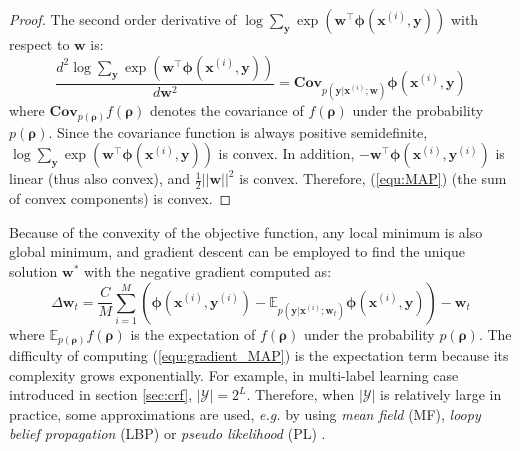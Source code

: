 \begin{proof}
    The second order derivative of $\log \sum_{\mathbf{y}} \exp(\mathbf{w}^\top \boldsymbol{\phi}(\mathbf{x}^{(i)},\mathbf{y}))$ with respect to 
    $\mathbf{w}$ is:
    \begin{equation}
    \frac{d^2 \log \sum_{\mathbf{y}} \exp(\mathbf{w}^\top \boldsymbol{\phi}(\mathbf{x}^{(i)},\mathbf{y}))}{d \mathbf{w}^2}=\mathbf{Cov}_{p(\mathbf{y}|\mathbf{x}^{(i)};\mathbf{w})}\boldsymbol{\phi}(\mathbf{x}^{(i)},\mathbf{y})
    \end{equation}
    where $\mathbf{Cov}_{p(\boldsymbol{\rho})}f(\boldsymbol{\rho})$ denotes the covariance of $f(\boldsymbol{\rho})$ under the probability $p(\boldsymbol{\rho})$. 
    Since the covariance function is always positive semidefinite, $\log \sum_{\mathbf{y}} \exp(\mathbf{w}^\top \boldsymbol{\phi}(\mathbf{x}^{(i)},\mathbf{y}))$ is convex. In addition, 
    $-\mathbf{w}^\top \boldsymbol{\phi}(\mathbf{x}^{(i)},\mathbf{y}^{(i)})$ is linear (thus also convex), and $\frac{1}{2} ||\mathbf{w}||^2$ is convex. Therefore, 
    (\ref{equ:MAP}) (the sum of convex components) is convex.  
\end{proof}
Because of the convexity of the objective function, any local minimum is also global minimum, and gradient descent can be employed to find the unique solution 
$\mathbf{w}^*$ with the negative gradient computed as: 
\begin{equation}
    \Delta \mathbf{w}_t=\frac{C}{M}\sum_{i=1}^M(\boldsymbol{\phi}(\mathbf{x}^{(i)},\mathbf{y}^{(i)})-\mathbb{E}_{p(\mathbf{y}|\mathbf{x}^{(i)};\mathbf{w}_t)} \boldsymbol{\phi}(\mathbf{x}^{(i)},\mathbf{y}))-\mathbf{w}_t 
\label{equ:gradient_MAP}
\end{equation}
where $\mathbb{E}_{p(\boldsymbol{\rho})}f(\boldsymbol{\rho})$ is the expectation of $f(\boldsymbol{\rho})$ under the probability $p(\boldsymbol{\rho})$.
The difficulty of computing (\ref{equ:gradient_MAP}) is the expectation term because its complexity grows exponentially. For example, in multi-label 
learning case introduced in section \ref{sec:crf}, $|\mathcal{Y}|=2^L$. 
Therefore, when $|\mathcal{Y}|$ is relatively large in practice, some approximations are used, \emph{e.g.} by using \emph{mean field} (MF), \emph{loopy 
belief propagation} (LBP) or \emph{pseudo likelihood} (PL) \citep{LBP, Kumar03,CRF,Accelerated_CRF}.  



